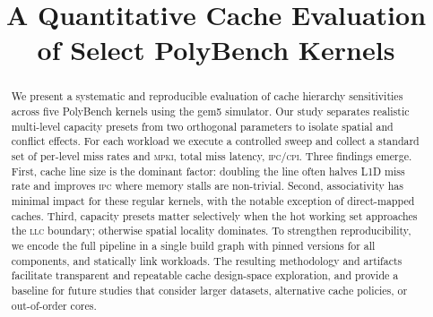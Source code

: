 \documentclass[conference]{IEEEtran}
\begin{document}
\title{A Quantitative Cache Evaluation of Select PolyBench Kernels}

\author{
}

\maketitle

\begin{abstract}

	We present a systematic and reproducible evaluation of cache hierarchy
	sensitivities across five PolyBench kernels using the gem5 simulator. Our
	study separates realistic multi-level capacity presets from two orthogonal
	parameters  to isolate spatial and conflict effects. For each workload we
	execute a controlled sweep and collect a standard set of per-level miss
	rates and \textsc{mpki}, total miss latency, \textsc{ipc}/\textsc{cpi}.
	Three findings emerge. First, cache line size is the dominant factor:
	doubling the line often halves L1D miss rate and improves \textsc{ipc}
	where memory stalls are non-trivial. Second, associativity has minimal
	impact for these regular kernels, with the notable exception of
	direct-mapped caches. Third, capacity presets matter selectively when the
	hot working set approaches the \textsc{llc} boundary; otherwise spatial
	locality dominates. To strengthen reproducibility, we encode the full
	pipeline in a single build graph with pinned versions for all components,
	and statically link workloads. The resulting methodology and artifacts
	facilitate transparent and repeatable cache design-space exploration, and
	provide a baseline for future studies that consider larger datasets,
	alternative cache policies, or out-of-order cores.

\end{abstract}
\end{document}
